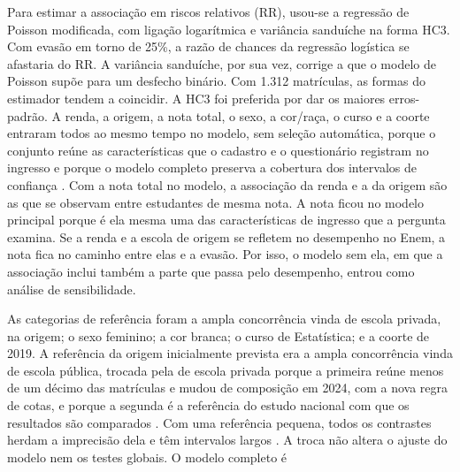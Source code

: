 \documentclass[12pt,a4paper]{article}
\begin{document}
Para estimar a associação em riscos relativos (RR), usou-se a regressão de Poisson modificada, com ligação logarítmica e variância sanduíche na forma HC3. Com evasão em torno de 25\%, a razão de chances da regressão logística se afastaria do RR. A variância sanduíche, por sua vez, corrige a que o modelo de Poisson supõe para um desfecho binário. Com 1.312 matrículas, as formas do estimador tendem a coincidir. A HC3 foi preferida por dar os maiores erros-padrão. A renda, a origem, a nota total, o sexo, a cor/raça, o curso e a coorte entraram todos ao mesmo tempo no modelo, sem seleção automática, porque o conjunto reúne as características que o cadastro e o questionário registram no ingresso e porque o modelo completo preserva a cobertura dos intervalos de confiança \citep[p.~375]{harrell1996multivariable}. Com a nota total no modelo, a associação da renda e a da origem são as que se observam entre estudantes de mesma nota. A nota ficou no modelo principal porque é ela mesma uma das características de ingresso que a pergunta examina. Se a renda e a escola de origem se refletem no desempenho no Enem, a nota fica no caminho entre elas e a evasão. Por isso, o modelo sem ela, em que a associação inclui também a parte que passa pelo desempenho, entrou como análise de sensibilidade.

As categorias de referência foram a ampla concorrência vinda de escola privada, na origem; o sexo feminino; a cor branca; o curso de Estatística; e a coorte de 2019. A referência da origem inicialmente prevista era a ampla concorrência vinda de escola pública, trocada pela de escola privada porque a primeira reúne menos de um décimo das matrículas e mudou de composição em 2024, com a nova regra de cotas, e porque a segunda é a referência do estudo nacional com que os resultados são comparados \citep{paulaDESIGUALDADESAPOSACESSO2024}. Com uma referência pequena, todos os contrastes herdam a imprecisão dela e têm intervalos largos \citep[p.~1025]{easton1991floating}. A troca não altera o ajuste do modelo nem os testes globais. O modelo completo é
\end{document}
